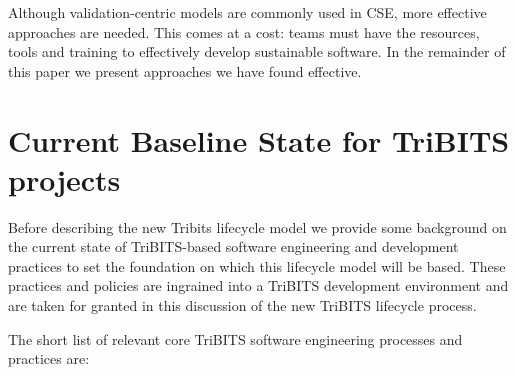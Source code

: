 \documentclass[11pt]{SANDreport}
\begin{document}
Although validation-centric models are commonly used in CSE, more effective approaches are needed.  This comes at a cost: teams must have the resources, tools and training to effectively develop sustainable software.  In the remainder of this paper we present approaches we have found effective.

%
{}\section{Current Baseline State for TriBITS projects}
\label{sec:tribts_current_state}
%

Before describing the new Tribits lifecycle model we provide some background 
on the current state of TriBITS-based
software engineering and development practices to set the foundation
on which this lifecycle model will be based.  These
practices and policies are ingrained into a TriBITS development
environment and are taken for granted in this discussion of the new
TriBITS lifecycle process.

The short list of relevant core TriBITS software engineering processes and
practices are:
\end{document}
